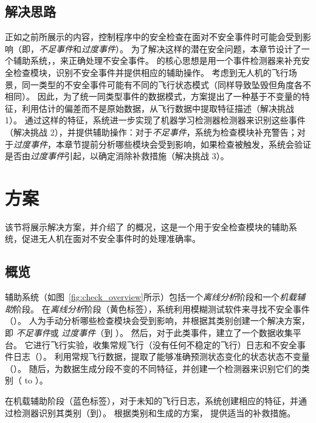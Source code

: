 \subsection{解决思路}

正如之前所展示的内容，控制程序中的安全检查在面对不安全事件时可能会受到影响（即，\emph{不足事件}和\emph{过度事件}）。
为了解决这样的潜在安全问题，本章节设计了一个辅助系统，\deccheck ，来正确处理不安全事件。
\deccheck 的核心思想是用一个事件检测器来补充安全检查模块，识别不安全事件并提供相应的辅助操作。
考虑到无人机的飞行场景，同一类型的不安全事件可能有不同的飞行状态模式（同样导致坠毁但角度各不相同）。
因此，为了统一同类型事件的数据模式，方案提出了一种基于不变量的特征，利用估计的偏差而不是原始数据，从飞行数据中提取特征描述（解决挑战 1）。
通过这样的特征，系统进一步实现了机器学习检测器检测器来识别这些事件（解决挑战 2），并提供辅助操作：对于\emph{不足事件}，系统为检查模块补充警告；对于\emph{过度事件}，本章节提前分析哪些模块会受到影响，如果检查被触发，系统会验证是否由\emph{过度事件}引起，以确定消除补救措施（解决挑战 3）。

\section{方案}
该节将展示解决方案，并介绍了 \deccheck 的概况，这是一个用于安全检查模块的辅助系统，促进无人机在面对不安全事件时的处理准确率。

\subsection{概览}
辅助系统（如图~\ref{fig:check_overview}所示）包括一个\emph{离线分析}阶段和一个\emph{机载辅助}阶段。
在\emph{离线分析}阶段（黄色标签），系统利用模糊测试软件来寻找不安全事件（）。
人为手动分析哪些检查模块会受到影响，并根据其类别创建一个解决方案，即 \emph{不足事件}或 \emph{过度事件}（到 ）。
然后，对于此类事件，\deccheck 建立了一个数据收集平台。
它进行飞行实验，收集常规飞行（没有任何不稳定的飞行）日志和不安全事件日志（）。
利用常规飞行数据，\deccheck 提取了能够准确预测状态变化的状态状态不变量（）。
随后，\deccheck 为数据生成分段不变的不同特征，并创建一个检测器来识别它们的类别（ to ）。

在机载辅助阶段（蓝色标签），对于未知的飞行日志，系统创建相应的特征，并通过检测器识别其类别（到）。
根据类别和生成的方案， \deccheck 提供适当的补救措施。

